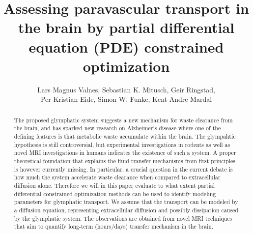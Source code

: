 \documentclass[12pt,a4paper]{article}
\title{Assessing paravascular transport in the brain by partial differential equation (PDE) constrained optimization}
\author{Lars Magnus Valnes, Sebastian K. Mitusch, Geir Ringstad, \\ 
Per Kristian Eide, Simon W. Funke, Kent-Andre Mardal }
\begin{document}
\maketitle

\begin{abstract}
The proposed glymphatic system suggests a new mechanism for waste clearance from the brain, and has sparked new research on Alzheimer's disease where one of the defining features
is that metabolic waste accumulate within the brain. The glympahtic hypothesis is still controversial, but experimental investigations in rodents as well as novel MRI investigations in humans indicates the existence of such a system. A proper theoretical foundation 
that explains the fluid transfer mechanisms from first principles is however currently missing.
In particular, a crucial question in the current debate is how much the system accelerate
waste clearance when compared to extracellular diffusion alone. Therefore
we will in this paper evaluate to what extent partial differential constrained optimization methods can be used to identify modeling parameters for glymphatic transport. We assume that the transport can be modeled by a diffusion equation, representing extracellular diffusion and possibly dissipation caused by the glymphatic system. The observations are obtained from novel MRI techniques that
aim to quantify long-term (hours/days) transfer mechanism in the brain. 

\end{abstract}
\end{document}
